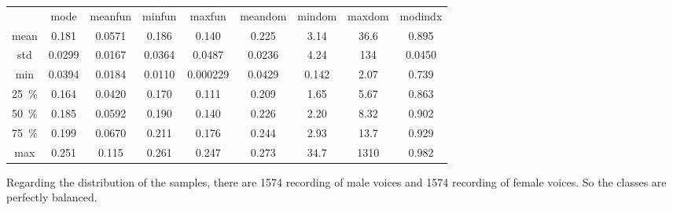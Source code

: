 \begin{table}[htb]
		\begin{subtable}{\textwidth}
			\centering
			\begin{tabular}{@{} c c c c  c c c c c @{}}\toprule
			 & mode & meanfun & minfun & maxfun & meandom & mindom & maxdom & modindx \\
			mean & \num{0.181} &\num{0.0571} & \num{0.186} & \num{0.140} & \num{0.225} & \num{3.14} &\num{36.6} & \num{0.895} \\
			std & \num{0.0299} & \num{0.0167} & \num{0.0364} & \num{0.0487} & \num{0.0236} & \num{4.24} & \num{134} & \num{0.0450} \\
			min & \num{0.0394} & \num{0.0184} & \num{0.0110} & \num{0.000229} & \num{0.0429} & \num{0.142} & \num{2.07} & \num{0.739} \\
			\SI{25}{\percent} & \num{0.164} & \num{0.0420} & \num{0.170} & \num{0.111} & \num{0.209} & \num{1.65} & \num{5.67} & \num{0.863} \\
			\SI{50}{\percent} & \num{0.185} & \num{0.0592} & \num{0.190} & \num{0.140} & \num{0.226} & \num{2.20} & \num{8.32} & \num{0.902} \\
			\SI{75}{\percent} & \num{0.199} & \num{0.0670} & \num{0.211}  & \num{0.176} & \num{0.244} & \num{2.93} & \num{13.7} & \num{0.929} \\
		max & \num{0.251} & \num{0.115} & \num{0.261} & \num{0.247} &
		\num{0.273} & \num{34.7} & \num{1310} & \num{0.982}\\ \bottomrule	
			\end{tabular}
		\end{subtable}\hfill\null%
	\label{tab_data_exploration}
\end{table}

Regarding the distribution of the samples, there are \num{1574} recording of male voices and \num{1574} recording of female voices. So the classes are perfectly balanced.

